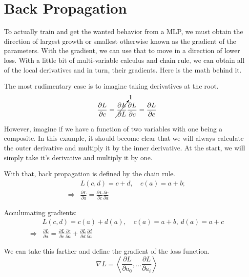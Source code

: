 \section{Back Propagation}

To actually train and get the wanted behavior from a MLP, 
we must obtain the direction of largest growth or smallest 
otherwise known as the gradient of the parameters. With the gradient,
we can use that to move in a direction of lower loss. With a little bit
of multi-variable calculus and chain rule, we can obtain all of the local derivatives
and in turn, their gradients. Here is the math behind it.

The most rudimentary case is to imagine taking derivatives at the root.
\begin{equation}
    \frac{\partial L}{\partial c} = \cancelto{1}{\frac{\partial L }{\partial L }} \frac{\partial L}{\partial c} = \frac{\partial L}{\partial c}
\end{equation}

However, imagine if we have a function of two variables with one being a composite.
In this example, it should become clear that we will always calculate the outer derivative and multiply it by the inner derivative.
At the start, we will simply take it's derivative and multiply it by one. 

\begin{definition}
    With that, back propagation is defined by the chain rule.
    \begin{align}
        & L(c, d) = c + d, \quad  c(a) = a+b; \\
        \Longrightarrow  & \boxed{\frac{\partial L}{\partial a} = \frac{\partial L }{\partial c } \frac{\partial c}{\partial a}}
    \end{align}

    Acculumating gradients:
    \begin{align}
        & L(c, d) = c(a) + d(a), \quad c(a) = a + b, \ d(a) = a + c\\
       \Longrightarrow & \boxed{\frac{\partial L}{\partial a} =\frac{\partial L}{\partial c}\frac{\partial c}{\partial a}+\frac{\partial L}{\partial d}\frac{\partial d}{\partial a}}
    \end{align}
\end{definition}

\begin{definition}[Gradient]
    We can take this farther and define the gradient of the loss function.
        \begin{equation}
        \boxed{\nabla L = \left\langle \frac{\partial L}{\partial a_0}, \dots \frac{\partial L}{\partial a_i} \right\rangle}
    \end{equation}
\end{definition}

